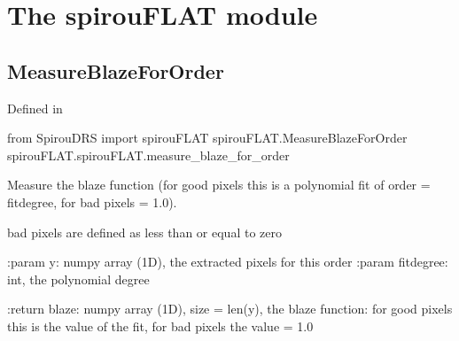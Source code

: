 
\clearpage
\newpage
\begin{minipage}{\textwidth}
\section{The spirouFLAT module}
\label{ch:the_module:spirouFLAT}

\subsection{MeasureBlazeForOrder}

Defined in \spirouFLAT{}

\begin{pythonbox}
from SpirouDRS import spirouFLAT
spirouFLAT.MeasureBlazeForOrder
spirouFLAT.spirouFLAT.measure_blaze_for_order
\end{pythonbox}

\begin{pythondocstring}
Measure the blaze function (for good pixels this is a polynomial fit of
order = fitdegree, for bad pixels = 1.0).

bad pixels are defined as less than or equal to zero

:param y: numpy array (1D), the extracted pixels for this order
:param fitdegree: int, the polynomial degree

:return blaze: numpy array (1D), size = len(y), the blaze function: for
               good pixels this is the value of the fit, for bad pixels the
               value = 1.0
\end{pythondocstring}
\end{minipage}

